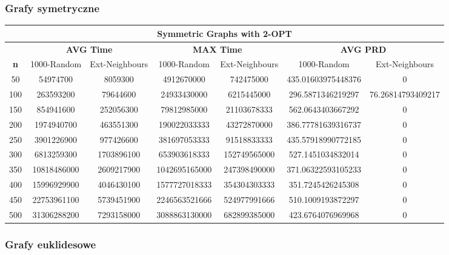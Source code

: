 \documentclass{article}
\begin{document}
\subsubsection{Grafy symetryczne}

\begin{center}
\begin{tabular}{|c|c|c|c|c|c|c|}
\hline
\multicolumn{7}{|c|}{\textbf{Symmetric Graphs with 2-OPT}}\\
\hline
 & \multicolumn{2}{|c|}{\textbf{AVG Time}} & \multicolumn{2}{|c|}{\textbf{MAX Time}} & \multicolumn{2}{|c|}{\textbf{AVG PRD}}\\
\hline
\textbf{n} & 1000-Random & Ext-Neighbours & 1000-Random & Ext-Neighbours & 1000-Random & Ext-Neighbours\\
\hline
50 & 54974700 & 8059300 & 4912670000 & 742475000 & 435.01603975448376 & 0\\
\hline
100 & 263593200 & 79644600 & 24933430000 & 6215445000 & 296.5871346219297 & 76.26814793409217\\
\hline
150 & 854941600 & 252056300 & 79812985000 & 21103678333 & 562.0643403667292 & 0\\
\hline
200 & 1974940700 & 463551300 & 190022033333 & 43272870000 & 386.77781639316737 & 0\\
\hline
250 & 3901226900 & 977426600 & 381697053333 & 91518833333 & 435.57918990772185 & 0\\
\hline
300 & 6813259300 & 1703896100 & 653903618333 & 152749565000 & 527.1451034832014 & 0\\
\hline
350 & 10818486000 & 2609217900 & 1042695165000 & 247398490000 & 371.06322593105233 & 0\\
\hline
400 & 15996929900 & 4046430100 & 1577727018333 & 354304303333 & 351.7245426245308 & 0\\
\hline
450 & 22753961100 & 5739451900 & 2246563521666 & 524977991666 & 510.1009193872297 & 0\\
\hline
500 & 31306288200 & 7293158000 & 3088863130000 & 682899385000 & 423.6764076969968 & 0\\
\hline
\end{tabular}
\end{center}


\subsubsection{Grafy euklidesowe}
\end{document}
